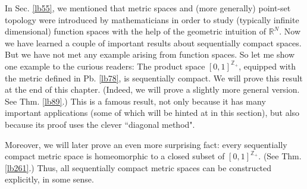 \documentclass[12pt,b5paper,notitlepage]{article}
\theoremstyle{definition}
\theoremstyle{plain}
\newcommand{\Zbb}{\mathbb Z}
\newcommand{\Rbb}{\mathbb R}
\numberwithin{equation}{section}
\begin{document}
In Sec. \ref{lb55}, we mentioned that metric spaces and (more generally) point-set topology were introduced by mathematicians in order to study (typically infinite dimensional) function spaces with the help of the geometric intuition of $\Rbb^N$.  Now we have learned a couple of important results about sequentially compact spaces. But we have not met any example arising from function spaces. So let me show one example to the curious readers: The product space $[0,1]^{\Zbb_+}$, equipped with the metric defined in Pb. \ref{lb78}, is sequentially compact. We will prove this result at the end of this chapter. (Indeed, we will prove a slightly more general version. See  Thm. \ref{lb89}.) This is a famous result, not only because it has many important applications (some of which will be hinted at in this section), but also because its proof uses the clever  ``diagonal method".  

Moreover, we will later prove an even more surprising fact: every sequentially compact metric space is homeomorphic to a closed subset of $[0,1]^{\Zbb_+}$. (See Thm. \ref{lb261}.) Thus, all sequentially compact metric spaces can be constructed explicitly, in some sense.
\end{document}
